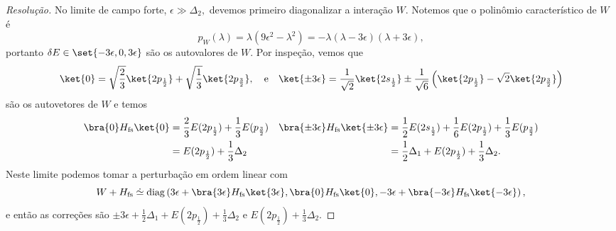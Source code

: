 \begin{proof}[Resolução]
   No limite de campo forte, \(\epsilon \gg \Delta_2,\) devemos primeiro diagonalizar a interação \(W.\) Notemos que o polinômio característico de \(W\) é
   \begin{equation*}
       p_W(\lambda) = \lambda(9\epsilon^2 - \lambda^2) = -\lambda(\lambda - 3\epsilon)(\lambda + 3 \epsilon),
   \end{equation*}
   portanto \(\delta E \in \set{- 3 \epsilon, 0, 3 \epsilon}\) são os autovalores de \(W.\) Por inspeção, vemos que
   \begin{equation*}
      \ket{0} = \sqrt{\frac23}\ket{2p_{\frac12}} + \sqrt{\frac13}\ket{2p_{\frac32}},
      \quad\text{e}\quad
      \ket{\pm3\epsilon} = \frac{1}{\sqrt{2}} \ket{2s_{\frac12}} \pm \frac{1}{\sqrt{6}}\left( \ket{2p_{\frac12}} - \sqrt{2} \ket{2p_{\frac32}}\right)
   \end{equation*}
   são os autovetores de \(W\) e temos
   \begin{align*}
      \bra{0}H_\mathrm{fs}\ket{0} &= \frac23 E(2p_\frac12) + \frac13 E(p_\frac32)&
      \bra{\pm3 \epsilon}H_\mathrm{fs}\ket{\pm 3 \epsilon} &= \frac12 E(2s_{\frac12}) + \frac16 E(2p_{\frac12}) + \frac13 E(p_{\frac32})\\
                                                           &= E(2p_\frac12) + \frac13 \Delta_2&
                                                           &= \frac12 \Delta_1 + E(2p_\frac12) + \frac13 \Delta_2.
   \end{align*}
   Neste limite podemos tomar a perturbação em ordem linear com
   \begin{equation*}
      W + H_\mathrm{fs} \mathrel{\dot{\simeq}} \operatorname{diag}\left(3\epsilon + \bra{3 \epsilon}H_\mathrm{fs}\ket{3\epsilon},\bra{0}H_\mathrm{fs}\ket{0}, -3 \epsilon + \bra{-3 \epsilon}H_\mathrm{fs}\ket{-3\epsilon}\right),
   \end{equation*}
   e então as correções são \(\pm3 \epsilon + \frac12 \Delta_1 + E(2p_\frac12) + \frac13 \Delta_2\) e \(E(2p_\frac12) + \frac13 \Delta_2.\) 
\end{proof}

